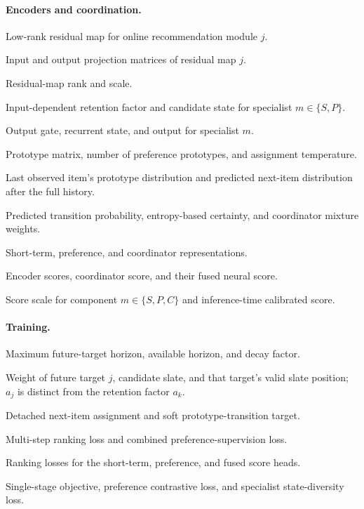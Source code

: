 \documentclass[11pt]{article}
\begin{document}
\paragraph{Encoders and coordination.}
\begin{description}[leftmargin=2.4cm,labelwidth=2.1cm,itemsep=0pt]
\item[$\mathcal R_j$] Low-rank residual map for online recommendation module $j$.
\item[$A_j,B_j$] Input and output projection matrices of residual map $j$.
\item[$r,\alpha_{\mathrm{LoRA}}$] Residual-map rank and scale.
\item[$a_k^{(m)},\widetilde h_k^{(m)}$] Input-dependent retention factor and candidate state for specialist $m\in\{S,P\}$.
\item[$g_k^{(m)},h_k^{(m)},o_k^{(m)}$] Output gate, recurrent state, and output for specialist $m$.
\item[$C,M,\tau_p$] Prototype matrix, number of preference prototypes, and assignment temperature.
\item[$q_t,\widehat q_{t+1}$] Last observed item's prototype distribution and predicted next-item distribution after the full history.
\item[$\rho_t,c_t,w_S,w_P$] Predicted transition probability, entropy-based certainty, and coordinator mixture weights.
\item[$s_S,s_P,s_C$] Short-term, preference, and coordinator representations.
\item[$z_S,z_P,z_C,z$] Encoder scores, coordinator score, and their fused neural score.
\item[$\kappa_m,\widetilde z$] Score scale for component $m\in\{S,P,C\}$ and inference-time calibrated score.
\end{description}

\paragraph{Training.}
\begin{description}[leftmargin=2.4cm,labelwidth=2.1cm,itemsep=0pt]
\item[$F,F',\eta$] Maximum future-target horizon, available horizon, and decay factor.
\item[$a_j,\mathcal S,p_j$] Weight of future target $j$, candidate slate, and that target's valid slate position; $a_j$ is distinct from the retention factor $a_k$.
\item[$q^+,y_{\mathrm{shift}}$] Detached next-item assignment and soft prototype-transition target.
\item[$\mathcal L_{\mathrm{rank}},\mathcal L_P$] Multi-step ranking loss and combined preference-supervision loss.
\item[$\mathcal L_S,\mathcal L_{\mathrm{pref}},\mathcal L_{\mathrm{fused}}$] Ranking losses for the short-term, preference, and fused score heads.
\item[$\mathcal L_{\mathrm{DL}},\mathcal L_{\mathrm{con}},\mathcal L_{\mathrm{div}}$] Single-stage objective, preference contrastive loss, and specialist state-diversity loss.
\end{description}
\end{document}
